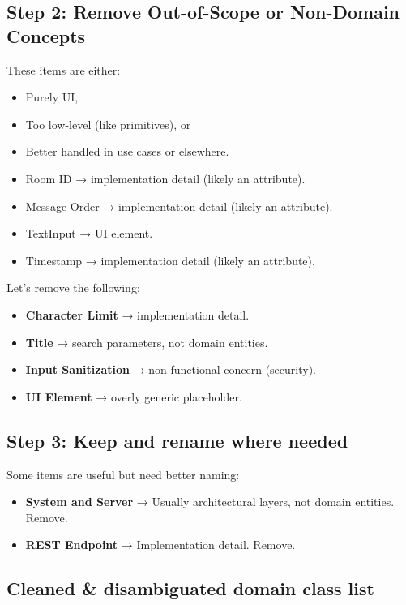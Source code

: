 \documentclass[]{VUMIFTemplateClass}
\begin{document}
\subsection{Step 2: Remove Out-of-Scope or Non-Domain Concepts}

These items are either:

\begin{itemize}
    \item Purely UI,
    \item Too low-level (like primitives), or
    \item Better handled in use cases or elsewhere.
    \item Room ID → implementation detail (likely an attribute).
    \item Message Order → implementation detail (likely an attribute).
    \item TextInput → UI element.
    \item Timestamp → implementation detail (likely an attribute).
\end{itemize}

Let’s remove the following:

\begin{itemize}
    \item \textbf{Character Limit} → implementation detail.
    \item \textbf{Title} → search parameters, not domain entities.
    \item \textbf{Input Sanitization} → non-functional concern (security).
    \item \textbf{UI Element} → overly generic placeholder.
\end{itemize}

\subsection{Step 3: Keep and rename where needed}

Some items are useful but need better naming:

\begin{itemize}
    \item \textbf{System and Server} → Usually architectural layers, not domain entities. Remove.
    \item \textbf{REST Endpoint} → Implementation detail. Remove.
\end{itemize}


\subsection{Cleaned \& disambiguated domain class list}
\end{document}
